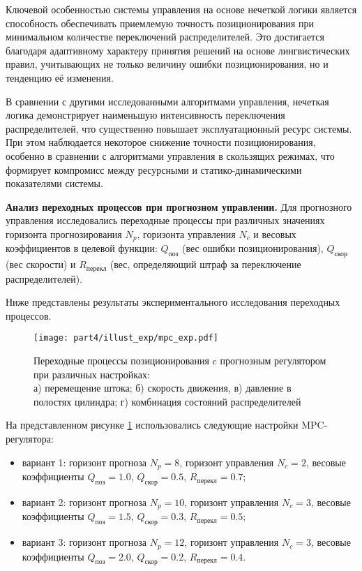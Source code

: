 Ключевой особенностью системы управления на основе нечеткой логики является способность обеспечивать приемлемую
точность позиционирования при минимальном количестве переключений распределителей. Это достигается благодаря адаптивному
характеру принятия решений на основе лингвистических правил, учитывающих не только величину ошибки позиционирования, но и тенденцию её изменения.

В сравнении с другими исследованными алгоритмами управления, нечеткая логика демонстрирует
наименьшую интенсивность переключения распределителей, что существенно повышает эксплуатационный ресурс системы.
При этом наблюдается некоторое снижение точности позиционирования, особенно в сравнении с алгоритмами управления
в скользящих режимах, что формирует компромисс между ресурсными и статико-динамическими показателями системы.


\textbf{Анализ переходных процессов при прогнозном управлении.}
Для прогнозного управления исследовались переходные процессы при различных значениях
горизонта прогнозирования $N_p$, горизонта управления $N_c$ и весовых коэффициентов в
целевой функции: $Q_{\text{поз}}$ (вес ошибки позиционирования), $Q_{\text{скор}}$
(вес скорости) и $R_{\text{перекл}}$ (вес, определяющий штраф за переключение распределителей).

Ниже представлены результаты экспериментального исследования переходных процессов.

\begin{figure}[h]
	\centering
	\texttt{[image: part4/illust\_exp/mpc\_exp.pdf]}
	\caption{Переходные процессы позиционирования c прогнозным регулятором при различных настройках:\\
		а) перемещение штока; б) скорость движения, в) давление в полостях цилиндра; г) комбинация состояний распределителей}
	\label{fig:mpc_exp}
\end{figure}

На представленном рисунке \ref{fig:mpc_exp} использовались следующие настройки MPC-регулятора:
\begin{itemize}
	\item вариант 1: горизонт прогноза $N_p = 8$,
	      горизонт управления $N_c = 2$,
	      весовые коэффициенты $Q_{\text{поз}} = \num{1.0}$,
	      $Q_{\text{скор}} = \num{0.5}$, $R_{\text{перекл}} = \num{0.7}$;
	\item вариант 2: горизонт прогноза $N_p = 10$,
	      горизонт управления $N_c = 3$,
	      весовые коэффициенты $Q_{\text{поз}} = \num{1.5}$,
	      $Q_{\text{скор}} = \num{0.3}$, $R_{\text{перекл}} = \num{0.5}$;
	\item вариант 3: горизонт прогноза $N_p = 12$,
	      горизонт управления $N_c = 3$,
	      весовые коэффициенты $Q_{\text{поз}} = \num{2.0}$,
	      $Q_{\text{скор}} = \num{0.2}$, $R_{\text{перекл}} = \num{0.4}$.
\end{itemize}

